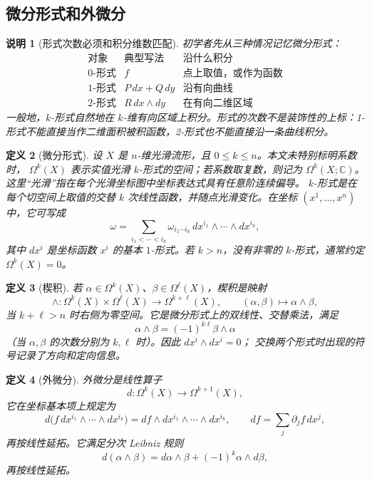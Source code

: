 \documentclass[UTF8,fontset=none,a4paper,11pt]{ctexart}
\theoremstyle{foundation-definition}
\newtheorem{definition}{定义}[section]
\theoremstyle{foundation-theorem}
\theoremstyle{foundation-proposition}
\theoremstyle{foundation-example}
\theoremstyle{foundation-remark}
\newtheorem{remark}[definition]{说明}
\theoremstyle{foundation-theorem}
\begin{document}
\subsection{微分形式和外微分}

\begin{remark}[形式次数必须和积分维数匹配]
初学者先从三种情况记忆微分形式：
\[
\begin{array}{c|c|c}
\text{对象}&\text{典型写法}&\text{沿什么积分}\\
\hline
0\text{-形式}&f&\text{点上取值，或作为函数}\\
1\text{-形式}&P\,dx+Q\,dy&\text{沿有向曲线}\\
2\text{-形式}&R\,dx\wedge dy&\text{在有向二维区域}
\end{array}
\]
一般地，\(k\)-形式自然地在 \(k\)-维有向区域上积分。形式的次数不是装饰性的上标：1-形式不能直接当作二维面积被积函数，2-形式也不能直接沿一条曲线积分。
\end{remark}

\begin{definition}[微分形式]\label{def:form}
设 \(X\) 是 \(n\)-维光滑流形，且 \(0\leq k\leq n\)。本文未特别标明系数时，
\(\Omega^k(X)\) 表示实值光滑 \(k\)-形式的空间；若系数取复数，则记为
\(\Omega^k(X;\mathbb C)\)。这里“光滑”指在每个光滑坐标图中坐标表达式具有任意阶连续偏导。
\(k\)-形式是在每个切空间上取值的交替 \(k\) 次线性函数，并随点光滑变化。在坐标 \((x^1,\dots,x^n)\) 中，它可写成
\[
\omega=\sum_{i_1<\cdots<i_k}
\omega_{i_1\cdots i_k}\,dx^{i_1}\wedge\cdots\wedge dx^{i_k},
\]
其中 \(dx^i\) 是坐标函数 \(x^i\) 的基本 \(1\)-形式。若 \(k>n\)，没有非零的
\(k\)-形式，通常约定 \(\Omega^k(X)=0\)。
\end{definition}

\begin{definition}[楔积]\label{def:wedge-product}
若 \(\alpha\in\Omega^k(X)\)、\(\beta\in\Omega^\ell(X)\)，楔积是映射
\[
\wedge:\Omega^k(X)\times\Omega^\ell(X)\longrightarrow\Omega^{k+\ell}(X),
\qquad (\alpha,\beta)\longmapsto\alpha\wedge\beta,
\]
当 \(k+\ell>n\) 时右侧为零空间。它是微分形式上的双线性、交替乘法，满足
\[
\alpha\wedge\beta=(-1)^{k\ell}\beta\wedge\alpha
\]
（当 \(\alpha,\beta\) 的次数分别为 \(k,\ell\) 时）。因此 \(dx^i\wedge dx^i=0\)；
交换两个形式时出现的符号记录了方向和定向信息。
\end{definition}

\begin{definition}[外微分]\label{def:exterior-derivative}
外微分是线性算子
\[
d:\Omega^k(X)\longrightarrow\Omega^{k+1}(X),
\]
它在坐标基本项上规定为
\[
d\bigl(f\,dx^{i_1}\wedge\cdots\wedge dx^{i_k}\bigr)
=df\wedge dx^{i_1}\wedge\cdots\wedge dx^{i_k},
\qquad
df=\sum_j\partial_jf\,dx^j,
\]
再按线性延拓。它满足分次 Leibniz 规则
\[
d(\alpha\wedge\beta)=d\alpha\wedge\beta+(-1)^k\alpha\wedge d\beta,
\]
再按线性延拓。
\end{definition}
\end{document}
